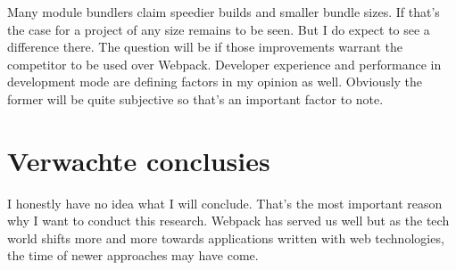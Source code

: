 Many module bundlers claim speedier builds and smaller bundle sizes. If that's the case for a project of any size remains to be seen. But I do expect to see a difference there. The question will be if those improvements warrant the competitor to be used over Webpack. Developer experience and performance in development mode are defining factors in my opinion as well. Obviously the former will be quite subjective so that's an important factor to note.

\section{Verwachte conclusies}
\label{sec:verwachte_conclusies}

I honestly have no idea what I will conclude. That's the most important reason why I want to conduct this research. Webpack has served us well but as the tech world shifts more and more towards applications written with web technologies, the time of newer approaches may have come.

